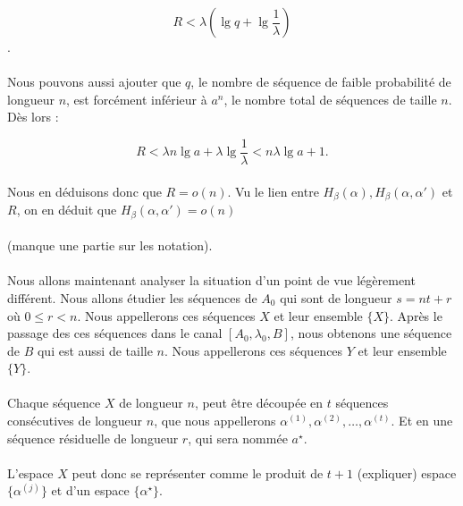 	\[R<\lambda\left(\lg q+\lg\frac{1}{\lambda}\right)\].
	
	\paragraph{}
	Nous pouvons aussi ajouter que $q$, le nombre de séquence de faible probabilité de longueur $n$, est forcément inférieur à $a^n$, le nombre total de séquences de taille $n$.
	Dès lors :
	
	\[R<\lambda n\lg a +\lambda \lg \frac{1}{\lambda}<n\lambda\lg a+1.\]
	
	\paragraph{}
	Nous en déduisons donc que $R=o(n)$. Vu le lien entre $H_\beta(\alpha),H_\beta(\alpha,\alpha')$ et $R$, on en déduit que $H_\beta(\alpha,\alpha')=o(n)$
	
	\paragraph{}
	(manque une partie sur les notation).
	
	\paragraph{}
	Nous allons maintenant analyser la situation d'un point de vue légèrement différent. Nous allons étudier les séquences de $A_0$ qui sont de longueur $s = nt+r$
	où $0\le r < n$. Nous appellerons ces séquences $X$ et leur ensemble $\{X\}$. Après le passage des ces séquences dans le canal $[A_0,\lambda_0,B]$, nous obtenons
	une séquence de $B$ qui est aussi de taille $n$. Nous appellerons ces séquences $Y$ et leur ensemble $\{Y\}$.
	
	\paragraph{}
	Chaque séquence $X$ de longueur $n$, peut être découpée en $t$ séquences consécutives de longueur $n$, que nous appellerons $\alpha^{(1)}, \alpha^{(2)}, \dots, \alpha^{(t)}$.
	Et en une séquence résiduelle de longueur $r$, qui sera nommée $a^\star$.
	
	\paragraph{}
	L'espace ${X}$ peut donc se représenter comme le produit de $t+1$ (expliquer) espace $\{\alpha^{(j)}\}$ et d'un espace $\{\alpha^\star\}$.
	
